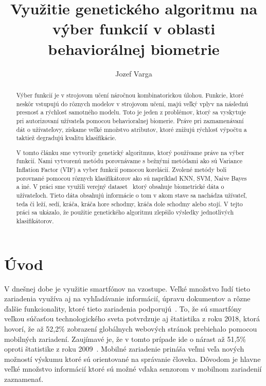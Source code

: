 \documentclass[runningheads]{llncs}
\begin{document}
%
\title{Využitie genetického algoritmu na výber funkcií v oblasti behaviorálnej biometrie}
%
%
\author{Jozef Varga}
%
%
\maketitle              %
%
\begin{abstract}
    Výber funkcií je v strojovom učení náročnou kombinatorickou úlohou. 
    Funkcie, ktoré neskôr vstupujú do rôznych modelov v strojovom učení, majú
    veľký vplyv na následnú presnosť a rýchlosť samotného modelu. Toto je jeden z problémov,
    ktorý sa vyskytuje pri autorizovaní užívateľa pomocou behavioralnej biomerie. Práve pri
    zaznamenávaní dát o užívateľovy, získame veľké množstvo atributov, ktoré znižujú rýchlosť výpočtu
    a taktiež degradujú kvalitu klasifikácie. 
    
    V tomto článku sme vytvorily genetický algoritmus, ktorý používame práve na výber funkcií. Nami vytvorenú
    metódu porovnávame s bežnými metódami ako sú Variance Inflation Factor (VIF) a vyber funkcií pomocou korelácií. 
    Zvolené metódy boli porovnané pomocou rôznych klasifikátorov ako sú napríklad KNN, SVM, Naive Bayes a iné. 
    V práci sme využili verejný dataset~\cite{ref_dataset_anguita,ref_dataset} ktorý obsahuje biometrické dáta o 
    užívateľoch. Tieto dáta obsahujú informácie o tom v akom stave sa nachádza užívateľ, teda či leží, sedí, 
    kráča,  kráča hore schodmy, kráča dole schodmy alebo stojí.
    V tejto práci sa ukázalo, že použitie genetického algoritmu zlepšilo výsledky jednotlivých klasifikátorov.

\end{abstract}
%

\section{Úvod}

V dnešnej dobe je využitie smartfónov na vzostupe. 
Veľké množstvo ľudí tieto zariadenia využíva aj na vyhľadávanie informácií, 
úpravu dokumentov a rôzne ďalšie funkcionality, 
ktoré tieto zariadenia podporujú~\cite{ref_bomhold}. 
To, že sú smartfóny veľkou súčasťou technologického sveta potvrdzuje aj 
štatistika z roku 2018, ktorá hovorí, že až 52,2\% 
zobrazení globálnych webových stránok prebiehalo pomocou mobilných zariadení. 
Zaujímavé je, že v tomto prípade ide o nárast až 51,5\% 
oproti štatistike z roku 2009~\cite{ref_statista19}. Mobilné zariadenie
prináša veľmi veľa nových možností výskumu ktoré sú orientované na správanie človeka.
Dôvodom je hlavne veľké množstvo informácií ktoré sú možné vďaka senzorom v mobilnom 
zariadenií zaznamenať. 
\end{document}
